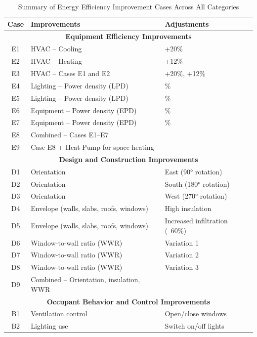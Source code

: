 \documentclass[conference,a4paper]{IEEEtran}
\begin{document}
    
\begin{table}[h]
  \centering
  \caption{Summary of Energy Efficiency Improvement Cases Across All Categories}
  \label{tab:all-cases}
  \begin{tabularx}{\linewidth}{|c|>{\raggedright\arraybackslash}X|>{\raggedright\arraybackslash}X|}
  \hline
  \textbf{Case} & \textbf{Improvements} & \textbf{Adjustments} \\
  \hline
  \multicolumn{3}{|c|}{\textbf{Equipment Efficiency Improvements}} \\
  \hline
  E1 & HVAC – Cooling & +20\% \\
  E2 & HVAC – Heating & +12\% \\
  E3 & HVAC – Cases E1 and E2 & +20\%, +12\% \\
  E4 & Lighting – Power density (LPD) & -15\% \\
  E5 & Lighting – Power density (LPD) & -21\% \\
  E6 & Equipment – Power density (EPD) & -10\% \\
  E7 & Equipment – Power density (EPD) & -20\% \\
  E8 & Combined – Cases E1–E7 & \\
  E9 & Case E8 + Heat Pump for space heating & \\
  \hline
  \multicolumn{3}{|c|}{\textbf{Design and Construction Improvements}} \\
  \hline
  D1 & Orientation & East (90° rotation) \\
  D2 & Orientation & South (180° rotation) \\
  D3 & Orientation & West (270° rotation) \\
  D4 & Envelope (walls, slabs, roofs, windows) & High insulation \\
  D5 & Envelope (walls, slabs, roofs, windows) & Increased infiltration (~60\%) \\
  D6 & Window-to-wall ratio (WWR) & Variation 1 \\
  D7 & Window-to-wall ratio (WWR) & Variation 2 \\
  D8 & Window-to-wall ratio (WWR) & Variation 3 \\
  D9 & Combined – Orientation, insulation, WWR & \\
  \hline
  \multicolumn{3}{|c|}{\textbf{Occupant Behavior and Control Improvements}} \\
  \hline
  B1 & Ventilation control & Open/close windows \\
  B2 & Lighting use & Switch on/off lights \\

\end{tabularx}
\end{table}
\end{document}
